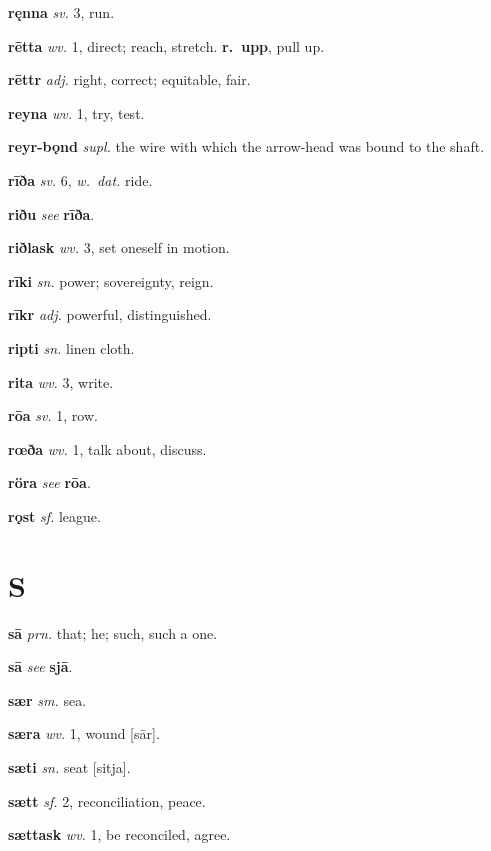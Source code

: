 \documentclass[12pt,letterpaper]{book}
\newcommand\emptypage{\clearpage{\pagestyle{empty}\cleardoublepage}}
\begin{document}
\noindent
\textbf{ręnna} \textit{sv.} 3, run.

\noindent
\textbf{rētta} \textit{wv.} 1, direct; reach, stretch.  \textbf{r.\ upp}, pull
	up.

\noindent
\textbf{rēttr} \textit{adj.} right, correct; equitable, fair.

\noindent
\textbf{reyna} \textit{wv.} 1, try, test.

\noindent
\textbf{reyr-bǫnd} \textit{supl.} the wire with which the arrow-head was bound
    to the shaft.

\noindent
\textbf{rīða} \textit{sv.} 6, \textit{w.\ dat.} ride.

\noindent
\textbf{riðu} \textit{} \textit{see} \textbf{rīða}.

\noindent
\textbf{riðlask} \textit{wv.} 3, set oneself in motion.

\noindent
\textbf{rīki} \textit{sn.} power; sovereignty, reign.

\noindent
\textbf{rīkr} \textit{adj.} powerful, distinguished.

\noindent
\textbf{ripti} \textit{sn.} linen cloth.

\noindent
\textbf{rita} \textit{wv.} 3, write.

\noindent
\textbf{rōa} \textit{sv.} 1, row.

\noindent
\textbf{rœða} \textit{wv.} 1, talk about, discuss.

\noindent
\textbf{röra} \textit{} \textit{see} \textbf{rōa}.

\noindent
\textbf{rǫst} \textit{sf.} league.

\emptypage

\chapter*{S}

\noindent
\textbf{sā} \textit{prn.} that; he; such, such a one.

\noindent
\textbf{sā} \textit{} \textit{see} \textbf{sjā}.

\noindent
\textbf{sær} \textit{sm.} sea.

\noindent
\textbf{særa} \textit{wv.} 1, wound [sār].

\noindent
\textbf{sæti} \textit{sn.} seat [sitja].

\noindent
\textbf{sætt} \textit{sf.} 2, reconciliation, peace.

\noindent
\textbf{sættask} \textit{wv.} 1, be reconciled, agree.
\end{document}
